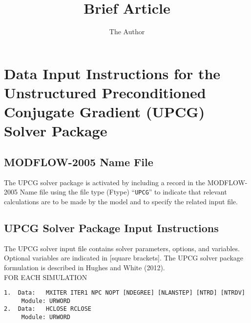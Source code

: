 \documentclass[12pt]{article} %
\title{Brief Article}
\author{The Author}
\begin{document}
\section*{Data Input Instructions for the Unstructured Preconditioned Conjugate Gradient (UPCG) Solver Package}

\subsection*{MODFLOW-2005 Name File}
The UPCG solver package is activated by including a record in the MODFLOW-2005 Name file using the file type (Ftype) ``\texttt{UPCG}'' to indicate that relevant calculations are to be made by the model and to specify the related input file.

\subsection*{UPCG Solver Package Input Instructions}
The UPCG solver input file contains solver parameters, options, and variables. Optional variables are indicated in [square brackets]. The UPCG solver package formulation is described in Hughes and White (2012).
\\

\noindent FOR EACH SIMULATION
\begin{verbatim}
1.  Data:   MXITER ITER1 NPC NOPT [NDEGREE] [NLANSTEP] [NTRD] [NTRDV]
     Module: URWORD
2.  Data:   HCLOSE RCLOSE
     Module: URWORD
\end{verbatim}
\end{document}
